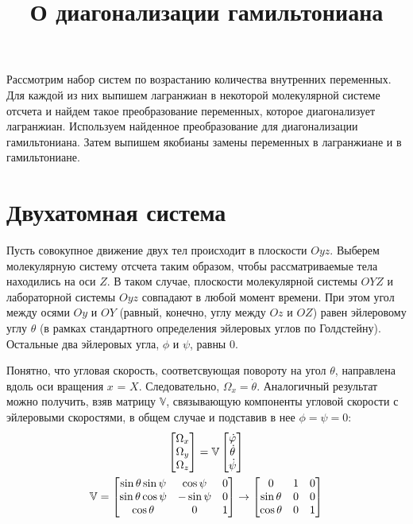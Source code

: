 \documentclass[12pt]{article}
\title{О диагонализации гамильтониана}
\date{}
\newcommand{\bbV}{\mathbb{V}}
\begin{document}
\maketitle

Рассмотрим набор систем по возрастанию количества внутренних переменных. Для каждой из них выпишем лагранжиан в некоторой молекулярной системе отсчета и найдем такое преобразование переменных, которое диагонализует лагранжиан. Используем найденное преобразование для диагонализации гамильтониана. Затем выпишем якобианы замены переменных в лагранжиане и в гамильтониане.

\section{Двухатомная система}
Пусть совокупное движение двух тел происходит в плоскости $Oyz$. Выберем молекулярную систему отсчета таким образом, чтобы рассматриваемые тела находились на оси $Z$. В таком случае, плоскости молекулярной системы $OYZ$ и лабораторной системы $Oyz$ совпадают в любой момент времени. При этом угол между осями $Oy$ и $OY$ (равный, конечно, углу между $Oz$ и $OZ$) равен эйлеровому углу $\theta$ (в рамках стандартного определения эйлеровых углов по Голдстейну). Остальные два эйлеровых угла, $\phi$ и $\psi$, равны 0.

Понятно, что угловая скорость, соответсвующая повороту на угол $\theta$, направлена вдоль оси вращения $x$ = $X$. Следовательно, $\Omega_x = \dot{\theta}$. Аналогичный результат можно получить, взяв матрицу $\bbV$, связывающую компоненты угловой скорости с эйлеровыми скоростями, в общем случае и подставив в нее $\phi = \psi = 0$:
\begin{gather}
	\begin{bmatrix}
	\Omega_x \\
	\Omega_y \\
	\Omega_z 
	\end{bmatrix} = \bbV 
	\begin{bmatrix}
		\dot{\varphi} \\
		\dot{\theta} \\
		\dot{\psi}
	\end{bmatrix} \notag \\
	\bbV = \begin{bmatrix}
		\sin \theta \sin \psi & \cos \psi & 0 \\
		\sin \theta \cos \psi & - \sin \psi & 0 \\
		\cos \theta & 0 & 1
	\end{bmatrix} \rightarrow
	\begin{bmatrix}
		0 & 1 & 0 \\
		\sin \theta & 0 & 0 \\
		\cos \theta & 0 & 1
	\end{bmatrix} \notag
\end{gather}
\end{document}
